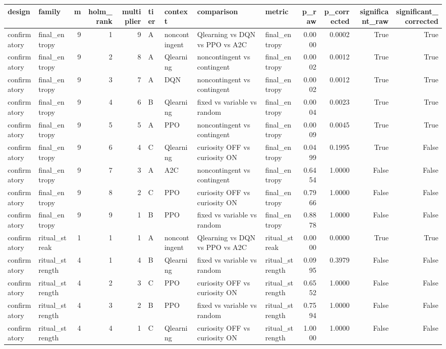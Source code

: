 \begin{tabular}{llrrrllllrrrr}
\toprule
design & family & m & holm_rank & multiplier & tier & context & comparison & metric & p_raw & p_corrected & significant_raw & significant_corrected \\
\midrule
confirmatory & final_entropy & 9 & 1 & 9 & A & noncontingent & Qlearning vs DQN vs PPO vs A2C & final_entropy & 0.0000 & 0.0002 & True & True \\
confirmatory & final_entropy & 9 & 2 & 8 & A & Qlearning & noncontingent vs contingent & final_entropy & 0.0002 & 0.0012 & True & True \\
confirmatory & final_entropy & 9 & 3 & 7 & A & DQN & noncontingent vs contingent & final_entropy & 0.0002 & 0.0012 & True & True \\
confirmatory & final_entropy & 9 & 4 & 6 & B & Qlearning & fixed vs variable vs random & final_entropy & 0.0004 & 0.0023 & True & True \\
confirmatory & final_entropy & 9 & 5 & 5 & A & PPO & noncontingent vs contingent & final_entropy & 0.0009 & 0.0045 & True & True \\
confirmatory & final_entropy & 9 & 6 & 4 & C & Qlearning & curiosity OFF vs curiosity ON & final_entropy & 0.0499 & 0.1995 & True & False \\
confirmatory & final_entropy & 9 & 7 & 3 & A & A2C & noncontingent vs contingent & final_entropy & 0.6454 & 1.0000 & False & False \\
confirmatory & final_entropy & 9 & 8 & 2 & C & PPO & curiosity OFF vs curiosity ON & final_entropy & 0.7966 & 1.0000 & False & False \\
confirmatory & final_entropy & 9 & 9 & 1 & B & PPO & fixed vs variable vs random & final_entropy & 0.8878 & 1.0000 & False & False \\
confirmatory & ritual_streak & 1 & 1 & 1 & A & noncontingent & Qlearning vs DQN vs PPO vs A2C & ritual_streak & 0.0000 & 0.0000 & True & True \\
confirmatory & ritual_strength & 4 & 1 & 4 & B & Qlearning & fixed vs variable vs random & ritual_strength & 0.0995 & 0.3979 & False & False \\
confirmatory & ritual_strength & 4 & 2 & 3 & C & PPO & curiosity OFF vs curiosity ON & ritual_strength & 0.6552 & 1.0000 & False & False \\
confirmatory & ritual_strength & 4 & 3 & 2 & B & PPO & fixed vs variable vs random & ritual_strength & 0.7594 & 1.0000 & False & False \\
confirmatory & ritual_strength & 4 & 4 & 1 & C & Qlearning & curiosity OFF vs curiosity ON & ritual_strength & 1.0000 & 1.0000 & False & False \\

\end{tabular}
